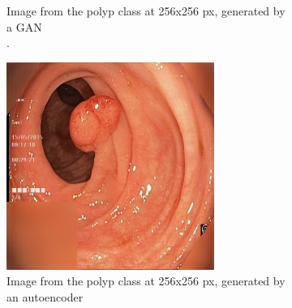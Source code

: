 \begin{figure}[t]
\begin{subfigure}[b]{0.4\textwidth}
            \caption[Hate to be this guy]%
            {{\small Image from the polyp class at 256x256 px, generated by a GAN \\.}}    
            \label{fig:polypGAN}
        \end{subfigure}
        \qquad\vfill%
        \begin{subfigure}[b]{0.4\textwidth}   
            \centering 
            \includegraphics[width=\textwidth]{experiments/figures/both/PAE.jpg}
            \caption[]%
            {{\small Image from the polyp class at 256x256 px, generated by an autoencoder }}    
            \label{fig:zAE}
        \end{subfigure}
        \qquad%
        \begin{subfigure}[b]{0.4\textwidth}   
            \centering 

\end{subfigure}
\end{figure}
